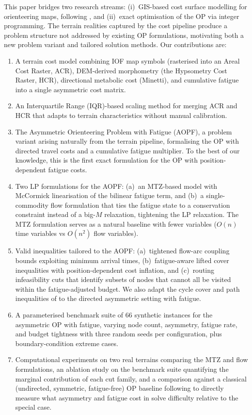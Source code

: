 \documentclass[11pt,a4paper]{article}
\begin{document}
This paper bridges two research streams: (i)~GIS-based cost surface modelling for orienteering maps, following \citet{ica2021lcp}, and (ii)~exact optimisation of the OP via integer programming.
The terrain realities captured by the cost pipeline produce a problem structure not addressed by existing OP formulations, motivating both a new problem variant and tailored solution methods.
Our contributions are:
\begin{enumerate}[nosep]
  \item A terrain cost model combining IOF map symbols (rasterised into an Areal Cost Raster, ACR), DEM-derived morphometry (the Hypsometry Cost Raster, HCR), directional metabolic cost (Minetti), and cumulative fatigue into a single asymmetric cost matrix.
  \item An Interquartile Range (IQR)-based scaling method for merging ACR and HCR that adapts to terrain characteristics without manual calibration.
  \item The Asymmetric Orienteering Problem with Fatigue (AOPF), a problem variant arising naturally from the terrain pipeline, formalising the OP with directed travel costs and a cumulative fatigue multiplier.
  To the best of our knowledge, this is the first exact formulation for the OP with position-dependent fatigue costs.
  \item Two LP formulations for the AOPF: (a)~an MTZ-based model with McCormick linearisation of the bilinear fatigue term, and (b)~a single-commodity flow formulation that ties the fatigue state to a conservation constraint instead of a big-$M$ relaxation, tightening the LP relaxation.
  The MTZ formulation serves as a natural baseline with fewer variables ($O(n)$ time variables vs $O(n^2)$ flow variables).
  \item Valid inequalities tailored to the AOPF: (a)~tightened flow-arc coupling bounds exploiting minimum arrival times, (b)~fatigue-aware lifted cover inequalities with position-dependent cost inflation, and (c)~routing infeasibility cuts that identify subsets of nodes that cannot all be visited within the fatigue-adjusted budget.
  We also adapt the cycle cover and path inequalities of \citet{fischetti1998solving} to the directed asymmetric setting with fatigue.
  \item A parameterised benchmark suite of 66 synthetic instances for the asymmetric OP with fatigue, varying node count, asymmetry, fatigue rate, and budget tightness with three random seeds per configuration, plus boundary-condition extreme cases.
  \item Computational experiments on two real terrains comparing the MTZ and flow formulations, an ablation study on the benchmark suite quantifying the marginal contribution of each cut family, and a comparison against a classical (undirected, symmetric, fatigue-free) OP baseline following \citet{fischetti1998solving} to directly measure what asymmetry and fatigue cost in solve difficulty relative to the special case.
\end{enumerate}
\end{document}
